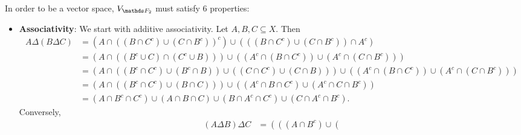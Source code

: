 \documentclass{homework}
\begin{document}
\begin{solution}
  In order to be a vector space, $V_{\F_2}$ must satisfy 6 properties:
  \begin{itemize}
    \item \textbf{Associativity}: We start with additive associativity. Let $A,B,C\subseteq X$. Then 
      \begin{align*}
        A\Delta\left( B\Delta C \right) &= \left( A\cap \left( \left( B\cap C^{c} \right) \cup
        \left( C\cap B^{c} \right)  \right) ^{c} \right)\cup \left( \left( \left( B\cap C^{c} \right)
    \cup \left( C\cap B^{c} \right) \right)\cap  A^{c}\right)  \\
                                        &= \left( A\cap \left( \left( B^{c}\cup C \right) \cap
                                            \left( C^{c}\cup B \right)  \right)  \right)\cup
                                            \left(
                                      \left( A^{c}\cap \left( B\cap C^{c} \right)  \right) \cup
                                    \left( A^{c}\cap \left( C\cap B^{c} \right)  \right) \right)   \\
                                        &= \left( A\cap \left( \left( B^{c}\cap C^{c} \right)\cup
                                        \left( B^{c}\cap B \right) \right) \cup \left( \left(
                                    C\cap C^{c}\right) \cup \left( C\cap B \right)  \right)  \right)
                                    \cup \left( \left( A^{c}\cap \left( B\cap C^{c} \right)  \right)
                                    \cup \left( A^{c}\cap \left( C\cap B^{c} \right)  \right)
                                  \right) \\
                                        &= \left( A\cap \left( \left( B^{c}\cap C^{c} \right)\cup
                                        \left( B\cap C \right)   \right)  \right)  \cup \left(
                                      \left(  A^{c}\cap B\cap C^{c} \right) \cup \left( A^{c}\cap
                                    C\cap B^{c} \right) \right) \\
                                        &= \left( A\cap B^{c}\cap C^{c} \right)\cup \left(
                                        A\cap B\cap C \right)\cup \left( 
                                    B\cap A^{c}\cap C^{c} \right) \cup \left( C\cap A^{c}\cap B^{c} \right)
      .\end{align*} Conversely, 
      \begin{align*}
        \left( A\Delta B \right) \Delta C&= \left( \left( \left( A\cap B^{c} \right) \cup \left(

\end{align*}
\end{itemize}
\end{solution}
\end{document}
